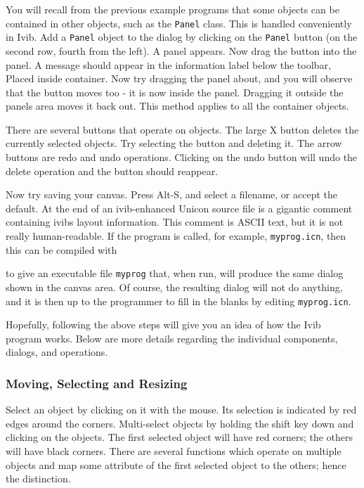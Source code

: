 You will recall from the previous example programs that some objects can
be contained in other objects, such as the \texttt{Panel} class. This
is handled conveniently in Ivib. Add a \texttt{Panel} object to the
dialog by clicking on the \texttt{Panel} button (on the second row,
fourth from the left). A panel appears. Now drag the button into the
panel. A message should appear in the information label below the
toolbar, {\textquotedbl}Placed inside container.{\textquotedbl} Now try
dragging the panel about, and you will observe that the button moves
too - it is now {\textquotedbl}inside{\textquotedbl} the panel.
Dragging it outside the panel{\textquotesingle}s area moves it back
out. This method applies to all the container objects.

There are several buttons that operate on objects. The large
{\textquotedbl}X{\textquotedbl} button deletes the currently selected
objects. Try selecting the button and deleting it. The arrow buttons
are {\textquotedbl}redo{\textquotedbl} and
{\textquotedbl}undo{\textquotedbl} operations. Clicking on the undo
button will undo the delete operation and the button should reappear.

Now try saving your canvas. Press Alt-S, and select a filename, or
accept the default. At the end of an ivib-enhanced Unicon source file
is a gigantic comment containing ivib{\textquotesingle}s layout
information. This comment is ASCII text, but it is not
really human-readable. If the program is called, for example,
\texttt{myprog.icn}, then this can be compiled with


\noindent
to give an executable file \texttt{myprog} that, when run, will produce
the same dialog shown in the canvas area. Of course, the resulting
dialog will not do anything, and it is then up to the programmer to
fill in the blanks by editing \texttt{myprog.icn}.

Hopefully, following the above steps will give you an idea of how the
Ivib program works. Below are more details regarding the individual
components, dialogs, and operations.

\subsubsection{Moving, Selecting and Resizing}

Select an object by clicking on it with the mouse. Its selection is
indicated by red edges around the corners. Multi-select objects by
holding the shift key down and clicking on the objects. The first
selected object will have red corners; the others will have black
corners. There are several functions which operate on multiple objects
and map some attribute of the first selected object to the others;
hence the distinction.

